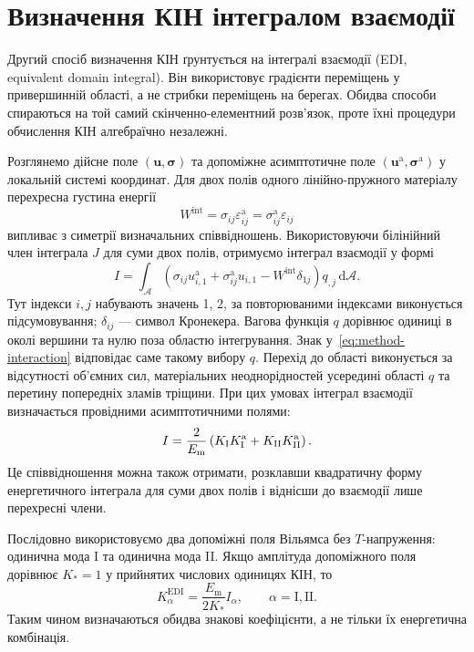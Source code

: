 \section{Визначення КІН інтегралом взаємодії}
\label{sec:methods-edi}

Другий спосіб визначення КІН ґрунтується на інтегралі взаємодії (EDI, equivalent domain integral). Він використовує градієнти переміщень у привершинній області, а не стрибки переміщень на берегах. Обидва способи спираються на той самий скінченно-елементний розв'язок, проте їхні процедури обчислення КІН алгебраїчно незалежні.

Розглянемо дійсне поле $(\boldsymbol u,\boldsymbol\sigma)$ та допоміжне асимптотичне поле $(\boldsymbol u^{\mathrm a},\boldsymbol\sigma^{\mathrm a})$ у локальній системі координат. Для двох полів одного лінійно-пружного матеріалу перехресна густина енергії
\begin{equation}
 W^{\mathrm{int}}=\sigma_{ij}\varepsilon_{ij}^{\mathrm a}
                 =\sigma_{ij}^{\mathrm a}\varepsilon_{ij}
 \label{eq:method-cross-energy}
\end{equation}
випливає з симетрії визначальних співвідношень. Використовуючи білінійний член інтеграла $J$ для суми двох полів, отримуємо інтеграл взаємодії у формі
\begin{equation}
 I=
 \int_{\mathcal A}
 \left(
 \sigma_{ij}u^{\mathrm a}_{i,1}
 +\sigma^{\mathrm a}_{ij}u_{i,1}
 -W^{\mathrm{int}}\delta_{1j}
 \right)q_{,j}\,\mathrm d\mathcal A.
 \label{eq:method-interaction}
\end{equation}
Тут індекси $i,j$ набувають значень 1, 2, за повторюваними індексами виконується підсумовування; $\delta_{ij}$ --- символ Кронекера. Вагова функція $q$ дорівнює одиниці в околі вершини та нулю поза областю інтегрування. Знак у~\eqref{eq:method-interaction} відповідає саме такому вибору $q$. Перехід до області виконується за відсутності об'ємних сил, матеріальних неоднорідностей усередині області $q$ та перетину попередніх зламів тріщини. При цих умовах інтеграл взаємодії визначається провідними асимптотичними полями:
\begin{equation}
 I=\frac{2}{E_{\mathrm m}}
 \left(K_{\mathrm{I}} K_{\mathrm I}^{\mathrm a}
       +K_{\mathrm{II}} K_{\mathrm {II}}^{\mathrm a}\right).
 \label{eq:method-interaction-k}
\end{equation}
Це співвідношення можна також отримати, розклавши квадратичну форму енергетичного інтеграла для суми двох полів і віднісши до взаємодії лише перехресні члени.

Послідовно використовуємо два допоміжні поля Вільямса без $T$-напруження: одинична мода I та одинична мода II. Якщо амплітуда допоміжного поля дорівнює $K_*=1$ у прийнятих числових одиницях КІН, то
\begin{equation}
 K_\alpha^{\mathrm{EDI}}=\frac{E_{\mathrm m}}{2K_*}I_\alpha,
 \qquad \alpha=\mathrm I,\mathrm{II}.
 \label{eq:method-edi-k}
\end{equation}
Таким чином визначаються обидва знакові коефіцієнти, а не тільки їх енергетична комбінація.

